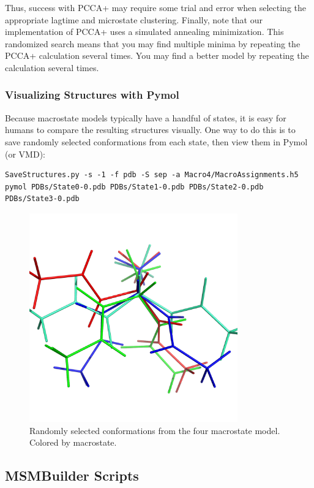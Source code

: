 \documentclass[12pt]{article}
\begin{document}
Thus, success with PCCA+ may require some trial and error when selecting the appropriate lagtime and microstate clustering.  Finally, note that our implementation of PCCA+ uses a simulated annealing minimization.  This randomized search means that you may find multiple minima by repeating the PCCA+ calculation several times.  You may find a better model by repeating the calculation several times.  

\subsubsection{Visualizing Structures with Pymol}

Because macrostate models typically have a handful of states, it is easy for humans to compare the resulting structures visually.  One way to do this 
is to save randomly selected conformations from each state, then view them in Pymol (or VMD):

\begin{verbatim}
SaveStructures.py -s -1 -f pdb -S sep -a Macro4/MacroAssignments.h5
pymol PDBs/State0-0.pdb PDBs/State1-0.pdb PDBs/State2-0.pdb PDBs/State3-0.pdb
\end{verbatim}

\begin{figure}
\begin{center}
\includegraphics[width=9.0cm]{figures/ala.png}
\caption{Randomly selected conformations from the four macrostate model.  Colored by macrostate.}
\end{center}
\end{figure}


\newpage

\subsection{MSMBuilder Scripts}
\end{document}
